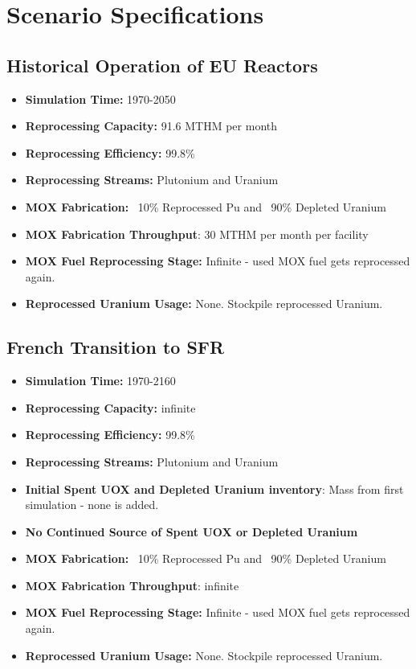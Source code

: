 \section{Scenario Specifications}

\subsection{Historical Operation of EU Reactors}
\begin{itemize}
	\item \textbf{Simulation Time:}  1970-2050 
	\item \textbf{Reprocessing Capacity:}  91.6 MTHM per month \cite{schneider_spent_2008}  
	\item \textbf{Reprocessing Efficiency:}  99.8\%  
	\item \textbf{Reprocessing Streams:}  Plutonium and Uranium  
	\item \textbf{\gls{MOX} Fabrication:}  ~10\% Reprocessed Pu and ~90\% Depleted Uranium  
	\item \textbf{\gls{MOX} Fabrication Throughput}: 30 MTHM per month per facility \cite{hugelmann_melox_1999}
	\item \textbf{\gls{MOX} Fuel Reprocessing Stage:}  Infinite - used \gls{MOX} fuel gets reprocessed again.  
	\item\textbf{Reprocessed Uranium Usage:}  None. Stockpile reprocessed Uranium. \\
\end{itemize}

\subsection{French Transition to \gls{SFR}}
\begin{itemize}
	\item \textbf{Simulation Time:}  1970-2160
	\item \textbf{Reprocessing Capacity:}  infinite 
	\item \textbf{Reprocessing Efficiency:}  99.8\%  
	\item \textbf{Reprocessing Streams:} Plutonium and Uranium
	\item \textbf{Initial Spent \gls{UOX} and Depleted Uranium inventory}: Mass from first simulation - none is added.
	\item \textbf{No Continued Source of Spent \gls{UOX} or Depleted Uranium}  
	\item \textbf{\gls{MOX} Fabrication:}  ~10\% Reprocessed Pu and ~90\% Depleted Uranium  
	\item \textbf{\gls{MOX} Fabrication Throughput}: infinite
	\item \textbf{\gls{MOX} Fuel Reprocessing Stage:}  Infinite - used \gls{MOX} fuel gets reprocessed again.  
	\item\textbf{Reprocessed Uranium Usage:}  None. Stockpile reprocessed Uranium. \\
\end{itemize}

